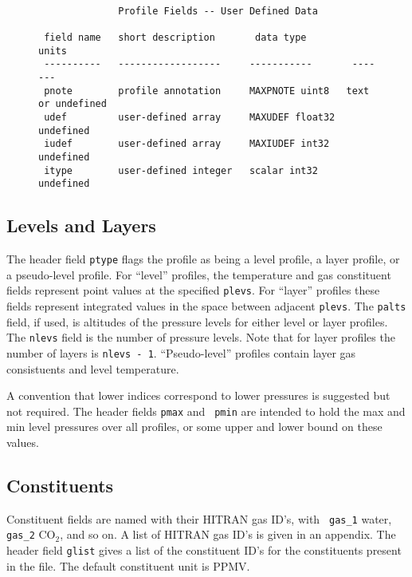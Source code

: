 \documentclass[12pt]{article}
\begin{document}
\begin{figure}
{\small
\begin{verbatim}

              Profile Fields -- User Defined Data
  
 field name   short description       data type         units
 ----------   ------------------     -----------       -------
 pnote        profile annotation     MAXPNOTE uint8   text or undefined
 udef         user-defined array     MAXUDEF float32  undefined
 iudef        user-defined array     MAXIUDEF int32   undefined
 itype        user-defined integer   scalar int32     undefined

\end{verbatim}
}
\end{figure}

\subsection{Levels and Layers}

The header field {\tt ptype} flags the profile as being a level
profile, a layer profile, or a pseudo-level profile.
For ``level'' profiles, the temperature and gas constituent fields
represent point values at the specified {\tt plevs}.  For ``layer''
profiles these fields represent integrated values in the space between
adjacent {\tt plevs}.  The {\tt palts} field, if used, is altitudes
of the pressure levels for either level or layer profiles.  The
{\tt nlevs} field is the number of pressure levels.  Note that for layer
profiles the number of layers is {\tt nlevs - 1}.  ``Pseudo-level''
profiles contain layer gas consistuents and level temperature.

A convention that lower indices correspond to lower pressures is
suggested but not required.  The header fields {\tt pmax} and {\tt
pmin} are intended to hold the max and min level pressures over all
profiles, or some upper and lower bound on these values.

\subsection{Constituents}

Constituent fields are named with their HITRAN gas ID's, with {\tt
gas\_1} water, {\tt gas\_2} CO$_2$, and so on.  A list of HITRAN
gas ID's is given in an appendix.  The header field {\tt glist}
gives a list of the constituent ID's for the constituents present
in the file.  The default constituent unit is PPMV.
\end{document}
